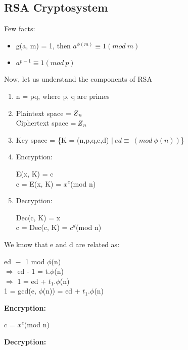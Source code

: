 \documentclass[11pt]{article}
\newcommand{\zbar}{\raisebox{0.2ex}{--}\kern-0.6em Z}
\begin{document}
\subsection{RSA Cryptosystem}
Few facts:
\begin{itemize}
    \item g(a, m) = 1, then $a^{\phi(m)} \equiv 1 (mod\ m)$
    \item $a^{p-1} \equiv 1 (mod \ p)$
\end{itemize}
Now, let us understand the components of RSA
\begin{enumerate}
    \item n = pq, where p, q are primes
    \item Plaintext space =  ${\zbar}_n$\\
    Ciphertext space = ${\zbar}_n$
    \item Key space = \{K = (n,p,q,e,d) $|\ ed \equiv\ (mod \ \phi(n))$\}
    \item Encryption:
    \begin{center}
        E(x, K) = c\\
        c = E(x, K) = $x^e$(mod n)
    \end{center}
    \item Decryption:
    \begin{center}
        Dec(c, K) = x\\
        c = Dec(c, K) = $c^d$(mod n)
    \end{center}
\end{enumerate}
We know that e and d are related as:
\begin{center}
    ed $\equiv$ 1 mod $\phi$(n)\\
    $\Rightarrow$ ed - 1 = t.$\phi$(n)\\
    $\Rightarrow$ 1 = ed + $t_1$.$\phi$(n)\\
    1 = gcd(e, $\phi$(n)) = ed + $t_1$.$\phi$(n)
\end{center}
\textbf{Encryption:}
\begin{center}
    c = $x^e$(mod n)
\end{center}
\textbf{Decryption:}
\end{document}
